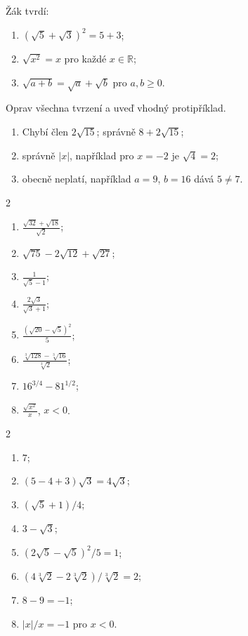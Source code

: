 \documentclass[11pt,a4paper]{article}
\begin{document}
\begin{zadaniReseniBox}[breakable=false,title={Rozšíření 2}]
Žák tvrdí:
\begin{enumerate}[label=\alph*)]
\item $(\sqrt5+\sqrt3)^2=5+3$;
\item $\sqrt{x^2}=x$ pro každé $x\in\mathbb R$;
\item $\sqrt{a+b}=\sqrt a+\sqrt b$ pro $a,b\ge0$.
\end{enumerate}
Oprav všechna tvrzení a uveď vhodný protipříklad.
\tcblower
\begin{enumerate}[label=\alph*)]
\item Chybí člen $2\sqrt{15}$; správně $8+2\sqrt{15}$;
\item správně $|x|$, například pro $x=-2$ je $\sqrt4=2$;
\item obecně neplatí, například $a=9$, $b=16$ dává $5\ne7$.
\end{enumerate}
\end{zadaniReseniBox}

\begin{zadaniReseniBox}[breakable=false,title={Domácí úkol}]
\begin{multicols}{2}
\begin{enumerate}[label=\alph*)]
\item $\displaystyle\frac{\sqrt{32}+\sqrt{18}}{\sqrt2}$;
\item $\sqrt{75}-2\sqrt{12}+\sqrt{27}$;
\item $\displaystyle\frac1{\sqrt5-1}$;
\item $\displaystyle\frac{2\sqrt3}{\sqrt3+1}$;
\item $\displaystyle\frac{(\sqrt{20}-\sqrt5)^2}{5}$;
\item $\displaystyle\frac{\sqrt[3]{128}-\sqrt[3]{16}}{\sqrt[3]2}$;
\item $16^{3/4}-81^{1/2}$;
\item $\displaystyle\frac{\sqrt{x^2}}x$, $x<0$.
\end{enumerate}
\end{multicols}
\tcblower
\begin{multicols}{2}
\begin{enumerate}[label=\alph*)]
\item $\boxed7$;
\item $(5-4+3)\sqrt3=\boxed{4\sqrt3}$;
\item $\boxed{(\sqrt5+1)/4}$;
\item $\boxed{3-\sqrt3}$;
\item $(2\sqrt5-\sqrt5)^2/5=\boxed1$;
\item $(4\sqrt[3]2-2\sqrt[3]2)/\sqrt[3]2=\boxed2$;
\item $8-9=\boxed{-1}$;
\item $|x|/x=\boxed{-1}$ pro $x<0$.
\end{enumerate}
\end{multicols}
\end{zadaniReseniBox}

\end{document}
